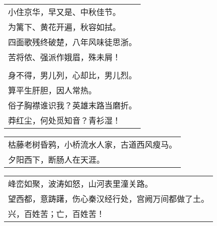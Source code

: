 \noindent\begin{minipage}{\linewidth}
  \vskip-3pt\begin{table}[H]
    \centering
    \begin{tabular}{@{}l@{}}
小住京华，早又是、中秋佳节。\\
为篱下、黄花开遍，秋容如拭。\\
四面歌残终破楚，八年风味徒思浙。\\
苦将侬、强派作娥眉，殊未屑！\\
\\
身不得，男儿列，心却比，男儿烈。\\
算平生肝胆，因人常热。\\
俗子胸襟谁识我？英雄末路当磨折。\\
莽红尘，何处觅知音？青衫湿！
    \end{tabular}
  \end{table}
\end{minipage}
\vspace{1cm}


\noindent\begin{minipage}{\linewidth}
  \vskip-3pt\begin{table}[H]
    \centering
    \begin{tabular}{@{}l@{}}
枯藤老树昏鸦，小桥流水人家，古道西风瘦马。\\
夕阳西下，断肠人在天涯。
    \end{tabular}
  \end{table}
\end{minipage}
\vspace{1cm}


\noindent\begin{minipage}{\linewidth}
  \vskip-3pt\begin{table}[H]
    \centering
    \begin{tabular}{@{}l@{}}
峰峦如聚，波涛如怒，山河表里潼关路。\\
望西都，意踌躇，伤心秦汉经行处，宫阙万间都做了土。\\
兴，百姓苦；亡，百姓苦！
    \end{tabular}
  \end{table}
\end{minipage}
\vspace{1cm}


